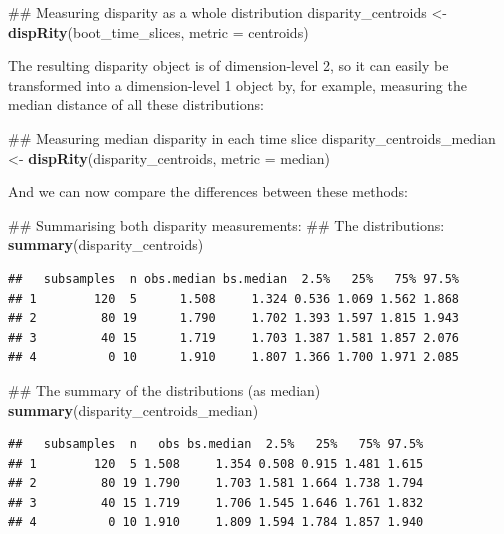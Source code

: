 \documentclass[]{book}
\newenvironment{Shaded}{\begin{snugshade}}{\end{snugshade}}
\newcommand{\KeywordTok}[1]{\textcolor[rgb]{0.13,0.29,0.53}{\textbf{#1}}}
\newcommand{\DataTypeTok}[1]{\textcolor[rgb]{0.13,0.29,0.53}{#1}}
\newcommand{\StringTok}[1]{\textcolor[rgb]{0.31,0.60,0.02}{#1}}
\newcommand{\NormalTok}[1]{#1}
\theoremstyle{definition}
\theoremstyle{definition}
\theoremstyle{remark}
\begin{document}
\begin{Shaded}
\begin{Highlighting}[]
\NormalTok{## Measuring disparity as a whole distribution}
\NormalTok{disparity_centroids <-}\StringTok{ }\KeywordTok{dispRity}\NormalTok{(boot_time_slices, }\DataTypeTok{metric =}\NormalTok{ centroids)}
\end{Highlighting}
\end{Shaded}

The resulting disparity object is of dimension-level 2, so it can easily
be transformed into a dimension-level 1 object by, for example,
measuring the median distance of all these distributions:

\begin{Shaded}
\begin{Highlighting}[]
\NormalTok{## Measuring median disparity in each time slice}
\NormalTok{disparity_centroids_median <-}\StringTok{ }\KeywordTok{dispRity}\NormalTok{(disparity_centroids, }\DataTypeTok{metric =}\NormalTok{ median)}
\end{Highlighting}
\end{Shaded}

And we can now compare the differences between these methods:

\begin{Shaded}
\begin{Highlighting}[]
\NormalTok{## Summarising both disparity measurements:}
\NormalTok{## The distributions:}
\KeywordTok{summary}\NormalTok{(disparity_centroids)}
\end{Highlighting}
\end{Shaded}

\begin{verbatim}
##   subsamples  n obs.median bs.median  2.5%   25%   75% 97.5%
## 1        120  5      1.508     1.324 0.536 1.069 1.562 1.868
## 2         80 19      1.790     1.702 1.393 1.597 1.815 1.943
## 3         40 15      1.719     1.703 1.387 1.581 1.857 2.076
## 4          0 10      1.910     1.807 1.366 1.700 1.971 2.085
\end{verbatim}

\begin{Shaded}
\begin{Highlighting}[]
\NormalTok{## The summary of the distributions (as median)}
\KeywordTok{summary}\NormalTok{(disparity_centroids_median)}
\end{Highlighting}
\end{Shaded}

\begin{verbatim}
##   subsamples  n   obs bs.median  2.5%   25%   75% 97.5%
## 1        120  5 1.508     1.354 0.508 0.915 1.481 1.615
## 2         80 19 1.790     1.703 1.581 1.664 1.738 1.794
## 3         40 15 1.719     1.706 1.545 1.646 1.761 1.832
## 4          0 10 1.910     1.809 1.594 1.784 1.857 1.940
\end{verbatim}
\end{document}
